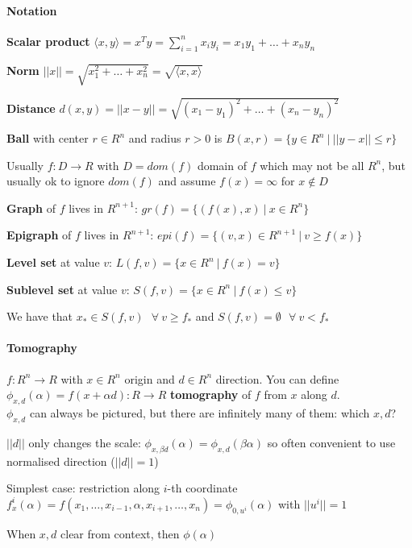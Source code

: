 \documentclass[10pt]{report}
\begin{document}
\paragraph{Notation}\begin{list}{}{}
	\item \textbf{Scalar product} $\langle x,y\rangle = x^Ty = \sum_{i=1}^n x_iy_i = x_1y_1+\ldots+x_ny_n$
	\item \textbf{Norm} $||x|| = \sqrt{x_1^2+\ldots+x_n^2} = \sqrt{\langle x,x\rangle}$
	\item \textbf{Distance} $d(x,y) = ||x-y|| = \sqrt{(x_1-y_1)^2+\ldots+(x_n-y_n)^2}$
	\item \textbf{Ball} with center $r\in R^n$ and radius $r > 0$ is $B(x,r) = \{y\in R^n\:|\:||y-x||\leq r\}$
\end{list}
Usually $f:D\rightarrow R$ with $D = dom(f)$ domain of $f$ which may not be all $R^n$, but usually ok to ignore $dom(f)$ and assume $f(x)=\infty$ for $x\not\in D$
\begin{list}{}{}
	\item \textbf{Graph} of $f$ lives in $R^{n+1}$: $gr(f) = \{(f(x),x)\:|\:x\in R^n\}$
	\item \textbf{Epigraph} of $f$ lives in $R^{n+1}$: $epi(f)=\{(v,x) \in R^{n+1}\:|\:v\geq f(x)\}$
	\item \textbf{Level set} at value $v$: $L(f,v)=\{x\in R^n\:|\:f(x)=v\}$
	\item \textbf{Sublevel set} at value $v$: $S(f,v)=\{x\in R^n\:|\:f(x)\leq v\}$
\end{list}
We have that $x_* \in S(f,v)\:\:\:\forall\:v\geq f_*$ and $S(f,v) = \emptyset\:\:\:\forall\:v<f_*$

\paragraph{Tomography} $f:R^n \rightarrow R$ with $x\in R^n$ origin and $d\in R^n$ direction. You can define $\phi_{x,d}(\alpha) = f(x + \alpha d): R \rightarrow R$ \textbf{tomography} of $f$ from $x$ along $d$.\\
$\phi_{x,d}$ can always be pictured, but there are infinitely many of them: which $x,d$?\begin{list}{}{}
	\item $||d||$ only changes the scale: $\phi_{x,\beta d}(\alpha) = \phi_{x,d}(\beta \alpha)$ so often convenient to use normalised direction ($||d|| = 1$)
	\item Simplest case: restriction along $i$-th coordinate\\
	$f_x^i(\alpha) = f(x_1,\ldots,x_{i-1},\alpha,x_{i+1},\ldots,x_n) = \phi_{0,u^i}(\alpha)$ with $||u^i|| = 1$
	\item When $x,d$ clear from context, then $\phi(\alpha)$
\end{list}
\end{document}
